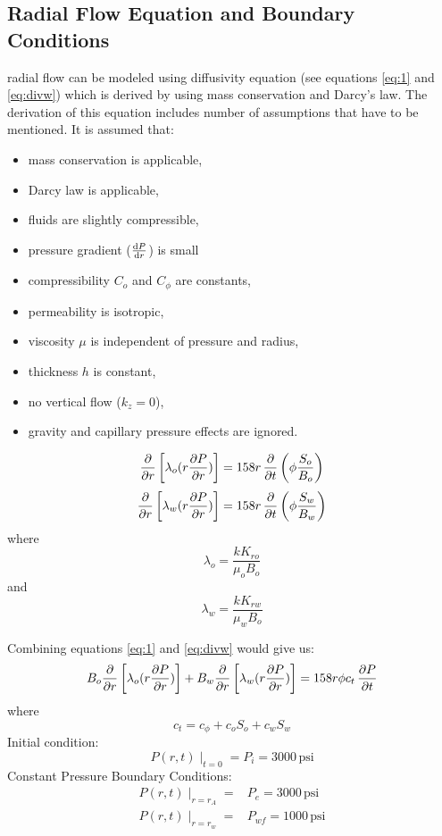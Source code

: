 \documentclass[12pt,letterpaper,titlepage]{article}
\begin{document}
\subsection{Radial Flow Equation and Boundary Conditions }
radial flow can be modeled using diffusivity equation (see equations \ref{eq:1} and \ref{eq:divw})
which is derived by using mass conservation and Darcy's law. The derivation of this equation includes number of assumptions that have to be mentioned. It is assumed that:
\begin{itemize}
\item mass conservation is applicable,
\item Darcy law is applicable,
\item fluids are slightly compressible,
\item pressure gradient ($\dv{P}{r}$) is small
\item compressibility $C_o$ and $C_\phi$ are constants,
\item permeability is isotropic,
\item viscosity $\mu$ is independent of pressure and radius,
\item thickness $h$ is constant,
\item no vertical flow ($k_z=0$),
\item gravity and capillary pressure effects are ignored.
\end{itemize}

\begin{equation}\label{eq:1}
\pdv{}{r}\left[\lambda_o(r\pdv{P}{r})\right] = 158 r\, \pdv{}{t}\left(\phi \frac{S_o}{B_o}\right)
\end{equation}
\begin{equation}\label{eq:divw}
\pdv{}{r}\left[\lambda_w(r\pdv{P}{r})\right] = 158 r\, \pdv{}{t}\left(\phi \frac{S_w}{B_w}\right)
\end{equation}
where $$\lambda_o=\frac{kK_{ro}}{\mu_o B_o}$$ and $$\lambda_w=\frac{kK_{rw}}{\mu_w B_o}$$

Combining equations \ref{eq:1} and \ref{eq:divw} would give us:
\begin{equation}\label{eq:wo}
B_o\pdv{}{r}\left[\lambda_o(r\pdv{P}{r})\right]+ B_w\pdv{}{r}\left[\lambda_w(r\pdv{P}{r})\right] = 158 r\phi c_t\, \pdv{P}{t}
\end{equation}
where $$c_t=c_\phi+c_o S_o+c_w S_w$$
Initial condition:
\begin{equation}
P(r,t)\mid_{t=0}=P_i=3000\,\text{psi}
\end{equation}
Constant Pressure Boundary Conditions:
\begin{align}
P(r,t)\mid_{r=r_A}=&P_e=3000\,\text{psi}\\
P(r,t)\mid_{r=r_w}=&P_{wf}=1000\,\text{psi}
\end{align}
\end{document}
